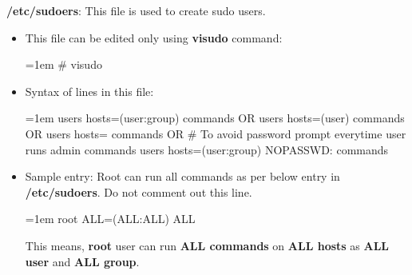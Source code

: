 \setlength{\columnsep}{3pt}
\begin{flushleft}
	\textbf{/etc/sudoers}: This file is used to create sudo users.
	\begin{itemize}
		\item This file can be edited only using \textbf{visudo} command:
		\bigskip
		\begin{tcolorbox}[breakable,notitle,boxrule=-0pt,colback=black,colframe=black]
			\color{green}
			\font=1em
			\# visudo
			\font=4pt
		\end{tcolorbox}
		\item Syntax of lines in this file:
		\bigskip
		\begin{tcolorbox}[breakable,notitle,boxrule=1pt,colback=pink,colframe=pink]
			\color{black}
			\font=1em
			users hosts=(user:group) commands
			\newline
			OR
			\newline
			users hosts=(user) commands
			\newline
			OR
			\newline
			users hosts= commands
			\newline
			OR
			\newline
			\color{blue}
			\# To avoid password prompt everytime user runs admin commands
			\newline
			\color{black}
			users hosts=(user:group) NOPASSWD: commands  
			\font=4pt
			
		\end{tcolorbox}
		\item Sample entry: Root can run all commands as per below entry in \textbf{/etc/sudoers}. Do not comment out this line.
		\bigskip
		\begin{tcolorbox}[breakable,notitle,boxrule=-0pt,colback=black,colframe=black]
			\color{green}
			\font=1em
			root ALL=(ALL:ALL) ALL
			\font=4pt
		\end{tcolorbox}
		This means, \textbf{root} user can run \textbf{ALL commands} on \textbf{ALL hosts} as \textbf{ALL user} and \textbf{ALL group}.
		
		
	\end{itemize}
	
	\newpage
	

\end{flushleft}
